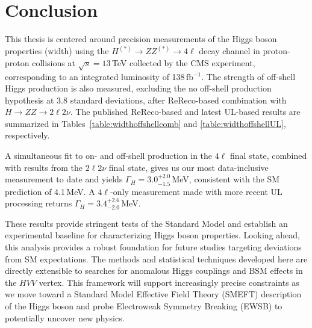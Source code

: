 \chapter{Conclusion} \label{chap:chap-5}

This thesis is centered around precision measurements of the Higgs boson properties (width) using the $H^{(*)} \to ZZ^{(*)} \to 4\ell$ decay channel in proton-proton collisions at $\sqrt{s} = 13$\,TeV collected by the CMS experiment, corresponding to an integrated luminosity of 138\,fb$^{-1}$. The strength of off-shell Higgs production is also measured, excluding the no off-shell production hypothesis at 3.8 standard deviations, after ReReco-based combination with $H \to ZZ \to 2\ell2\nu$. The published ReReco-based and latest UL-based results are summarized in Tables~\ref{table:widthoffshellcomb} and \ref{table:widthoffshellUL}, respectively.

A simultaneous fit to on- and off-shell production in the $4\ell$ final state, combined with results from the $2\ell2\nu$ final state, gives us our most data-inclusive measurement to date and yields $\Gamma_H = 3.0^{+2.0}_{-1.5}$\,MeV, consistent with the SM prediction of 4.1\,MeV. A $4\ell$-only measurement made with more recent UL processing returns $\Gamma_H = 3.4^{+2.6}_{-2.0}$\,MeV.

These results provide stringent tests of the Standard Model and establish an experimental baseline for characterizing Higgs boson properties. Looking ahead, this analysis provides a robust foundation for future studies targeting deviations from SM expectations. The methods and statistical techniques developed here are directly extensible to searches for anomalous Higgs couplings and BSM effects in the $HVV$ vertex. This framework will support increasingly precise constraints as we move toward a Standard Model Effective Field Theory (SMEFT) description of the Higgs boson and probe Electroweak Symmetry Breaking (EWSB) to potentially uncover new physics.







